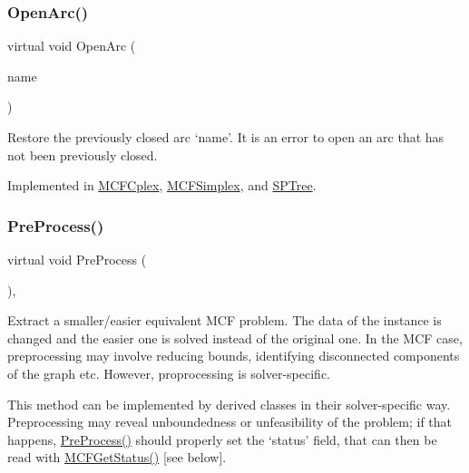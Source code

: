 \subsubsection{\texorpdfstring{Open\+Arc()}{OpenArc()}}
{\footnotesize\ttfamily virtual void Open\+Arc (\begin{DoxyParamCaption}\item[{\mbox{\hyperlink{class_m_c_f_class_a76aaabb20535c51a2752b93f6c38fe54}{c\+Index}}}]{name }\end{DoxyParamCaption})\hspace{0.3cm}{\ttfamily [pure virtual]}}

Restore the previously closed arc `name'. It is an error to open an arc that has not been previously closed. 

Implemented in \mbox{\hyperlink{class_m_c_f_cplex_af8adf5d3a1f9dfb9c2dd30c170663136}{M\+C\+F\+Cplex}}, \mbox{\hyperlink{class_m_c_f_simplex_af8adf5d3a1f9dfb9c2dd30c170663136}{M\+C\+F\+Simplex}}, and \mbox{\hyperlink{class_s_p_tree_af8adf5d3a1f9dfb9c2dd30c170663136}{S\+P\+Tree}}.

\mbox{\label{class_m_c_f_class_a0554708d9abb0e079a8d6f073def9bab}} 
\subsubsection{\texorpdfstring{Pre\+Process()}{PreProcess()}}
{\footnotesize\ttfamily virtual void Pre\+Process (\begin{DoxyParamCaption}\item[{void}]{ }\end{DoxyParamCaption})\hspace{0.3cm}{\ttfamily [inline]}, {\ttfamily [virtual]}}

Extract a smaller/easier equivalent M\+CF problem. The data of the instance is changed and the easier one is solved instead of the original one. In the M\+CF case, preprocessing may involve reducing bounds, identifying disconnected components of the graph etc. However, proprocessing is solver-\/specific.

This method can be implemented by derived classes in their solver-\/specific way. Preprocessing may reveal unboundedness or unfeasibility of the problem; if that happens, \mbox{\hyperlink{class_m_c_f_class_a0554708d9abb0e079a8d6f073def9bab}{Pre\+Process()}} should properly set the `status' field, that can then be read with \mbox{\hyperlink{class_m_c_f_class_a333e27ad7a73779b096cb70829cbe8be}{M\+C\+F\+Get\+Status()}} \mbox{[}see below\mbox{]}.

